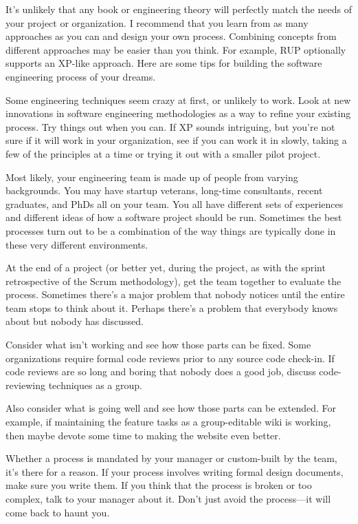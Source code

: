 
It’s unlikely that any book or engineering theory will perfectly match the needs of your project or organization. I recommend that you learn from as many approaches as you can and design your own process. Combining concepts from different approaches may be easier than you think. For example, RUP optionally supports an XP-like approach. Here are some tips for building the software engineering process of your dreams.


Some engineering techniques seem crazy at first, or unlikely to work. Look at new innovations in software engineering methodologies as a way to refine your existing process. Try things out when you can. If XP sounds intriguing, but you’re not sure if it will work in your organization, see if you can work it in slowly, taking a few of the principles at a time or trying it out with a smaller pilot project.


Most likely, your engineering team is made up of people from varying backgrounds. You may have startup veterans, long-time consultants, recent graduates, and PhDs all on your team. You all have different sets of experiences and different ideas of how a software project should be run. Sometimes the best processes turn out to be a combination of the way things are typically done in these very different environments.


At the end of a project (or better yet, during the project, as with the sprint retrospective of the Scrum methodology), get the team together to evaluate the process. Sometimes there’s a major problem that nobody notices until the entire team stops to think about it. Perhaps there’s a problem that everybody knows about but nobody has discussed.

Consider what isn’t working and see how those parts can be fixed. Some organizations require formal code reviews prior to any source code check-in. If code reviews are so long and boring that nobody does a good job, discuss code-reviewing techniques as a group.

Also consider what is going well and see how those parts can be extended. For example, if maintaining the feature tasks as a group-editable wiki is working, then maybe devote some time to making the website even better.


Whether a process is mandated by your manager or custom-built by the team, it’s there for a reason. If your process involves writing formal design documents, make sure you write them. If you think that the process is broken or too complex, talk to your manager about it. Don’t just avoid the process—it will come back to haunt you.


